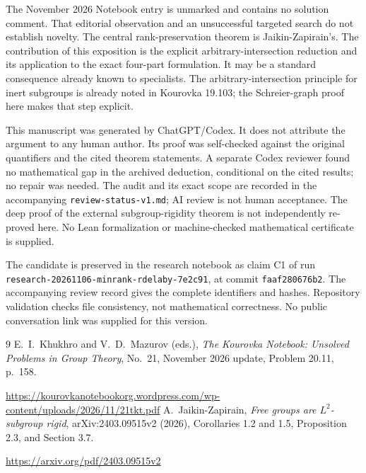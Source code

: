\documentclass[11pt,a4paper]{article}
\theoremstyle{remark}\newtheorem*{remark}{Remark}
\begin{document}
The November 2026 Notebook entry is unmarked and contains no solution comment. That editorial observation and an unsuccessful targeted search do not establish novelty. The central rank-preservation theorem is Jaikin-Zapirain's. The contribution of this exposition is the explicit arbitrary-intersection reduction and its application to the exact four-part formulation. It may be a standard consequence already known to specialists. The arbitrary-intersection principle for inert subgroups is already noted in Kourovka 19.103; the Schreier-graph proof here makes that step explicit.

This manuscript was generated by ChatGPT/Codex. It does not attribute the argument to any human author. Its proof was self-checked against the original quantifiers and the cited theorem statements. A separate Codex reviewer found no mathematical gap in the archived deduction, conditional on the cited results; no repair was needed. The audit and its exact scope are recorded in the accompanying \texttt{review-status-v1.md}; AI review is not human acceptance. The deep proof of the external subgroup-rigidity theorem is not independently re-proved here. No Lean formalization or machine-checked mathematical certificate is supplied.

The candidate is preserved in the research notebook as claim C1 of run \texttt{research-}\allowbreak\texttt{20261106-}\allowbreak\texttt{minrank-}\allowbreak\texttt{rdelaby-7e2c91}, at commit \texttt{faaf280676b2}. The accompanying review record gives the complete identifiers and hashes. Repository validation checks file consistency, not mathematical correctness. No public conversation link was supplied for this version.

\begin{thebibliography}{9}
 E.~I.~Khukhro and V.~D.~Mazurov (eds.), \emph{The Kourovka Notebook: Unsolved Problems in Group Theory}, No.~21, November 2026 update, Problem 20.11, p.~158.\par\url{https://kourovkanotebookorg.wordpress.com/wp-content/uploads/2026/11/21tkt.pdf}
 A.~Jaikin-Zapirain, \emph{Free groups are $L^2$-subgroup rigid}, arXiv:2403.09515v2 (2026), Corollaries 1.2 and 1.5, Proposition 2.3, and Section 3.7.\par\url{https://arxiv.org/pdf/2403.09515v2}
\end{thebibliography}
\end{document}
